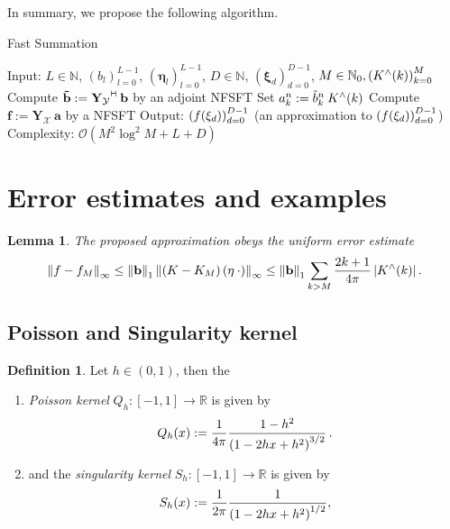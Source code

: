 \documentclass[11pt,a4paper,twoside,bibtotoc]{scrartcl}
\theoremstyle{plain}
\newtheorem{lemma}[theorem]{Lemma}
\theoremstyle{definition}
\newtheorem{definition}[theorem]{Definition}
\theoremstyle{remark}
\newcommand{\adj}{{\vdash \hspace*{-1.72mm} \dashv}}
\newcommand{\N}{\ensuremath{\mathbb{N}}}
\newcommand{\NZ}{\ensuremath{\mathbb{N}_{0}}}
\newcommand{\R}{\ensuremath{\mathbb{R}}}
\newcommand{\abs}[1]{\ensuremath{\left\vert#1\right\vert}}
\newcommand{\interv}[4]{\ensuremath{\left#1\left.#2,#3\right#4\right.}}
\newcommand{\fun}[2]{\ensuremath{#1{\hspace{-0.4ex}}\left(#2\right)}}
\newcommand{\paren}[1]{\ensuremath{\left(#1\right)}}
\newcommand{\mb}[1]{\mathbf{#1}}
\newcommand{\V}[1]{\mb{#1}}
\numberwithin{equation}{section}
\numberwithin{table}{section}
\numberwithin{figure}{section}
\begin{document}
In summary, we propose the following algorithm.
\begin{algorithm}[h]
  \caption{Fast Summation}
  \label{Applications:Algorithm:FastSummation}    
  \begin{algorithmic}
    \STATE  Input:  $L \in \N$, $\paren{b_{l}}_{l=0}^{L-1}$, $\paren{\V{\eta}_{l}}_{l=0}^{L-1}$, 
                    $D \in \N$, $\paren{\V{\xi}_{d}}_{d=0}^{D-1}$, $M \in \NZ, \paren{\fun{K^{\wedge}}{k}}_{k=0}^M$
    \STATE
    \STATE Compute $\V{\tilde{b}} := \V{Y_{\mathcal{Y}}}^{\adj} \: \V{b}$ by an
                    adjoint NFSFT 
        \STATE Set $a_{k}^n := \tilde{b}_{k}^n \: \fun{K^{\wedge}}{k}$
      \ENDFOR
    \ENDFOR
    \STATE Compute $\V{f} := \V{Y_{\mathcal{X}}} \: \V{a}$ by a NFSFT
    \STATE
    \STATE Output: $\paren{\fun{f}{\V{\xi}_{d}}}_{d=0}^{D-1}$ (an approximation to 
      $\paren{\fun{f}{\V{\xi}_{d}}}_{d=0}^{D-1}$)
    \STATE
    \STATE Complexity: $\mathcal{O}\left(M^2 \log^2M + L + D\right)$  
\end{algorithmic}
\end{algorithm}


\section{Error estimates and examples}\label{Basics:SphericalKernels}
\begin{lemma}\label{lemma:error}
  The proposed approximation obeys the uniform error estimate
  \begin{equation*}
    \left\|f - f_{M}\right\|_{\infty} \le
    \left\|\V{b}\right\|_1 \left\|\fun{\left(K-K_M\right)}{\V{\eta} \: \cdot
      }\right\|_{\infty} \le \left\|\V{b}\right\|_1 \sum_{k>M}
    \frac{2k+1}{4\pi} \abs{\fun{K^{\wedge}}{k}}.
  \end{equation*}
\end{lemma}

\subsection{Poisson and Singularity kernel}
\begin{definition}
  Let $h \in \interv{(}{0}{1}{)}$, then the
  \begin{enumerate}
  \item \emph{Poisson kernel}
    $Q_{h}:\interv{[}{-1}{1}{]} \rightarrow \R$ is given by
    \[
    \fun{Q_{h}}{x} := \frac{1}{4\pi} \frac{1-h^2}{\paren{1-2hx+h^2}^{3/2}}\,.
    \]
  \item and the \emph{singularity kernel}
    $S_{h}:\interv{[}{-1}{1}{]} \rightarrow \R$ is given by
    \[
    \fun{S_{h}}{x} := \frac{1}{2\pi} \frac{1}{\paren{1-2hx+h^2}^{1/2}},
    \]
  \end{enumerate}
\end{definition}
\end{document}
